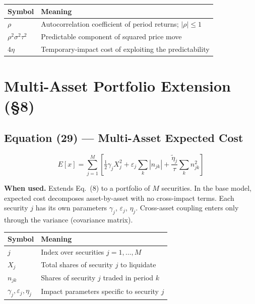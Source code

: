 \documentclass[11pt,a4paper]{article}
\begin{document}
\begin{center}
\begin{tabular}{@{}L{3.5cm}L{10cm}@{}}
\toprule
\textbf{Symbol} & \textbf{Meaning} \\
\midrule
$\rho$ & Autocorrelation coefficient of period returns; $|\rho|\leq1$ \\
$\rho^2\sigma^2\tau^2$ & Predictable component of squared price move \\
$4\eta$ & Temporary-impact cost of exploiting the predictability \\
\bottomrule
\end{tabular}
\end{center}

\section{Multi-Asset Portfolio Extension (\texorpdfstring{\S}{§}8)}

\subsection*{Equation (29) — Multi-Asset Expected Cost}

\begin{equation}
  E[x] = \sum_{j=1}^{M}\left[
    \tfrac{1}{2}\gamma_j X_j^2
    + \varepsilon_j\sum_{k}|n_{jk}|
    + \frac{\tilde{\eta}_j}{\tau}\sum_{k}n_{jk}^2
  \right]
\end{equation}

\textbf{When used.} Extends Eq.~(8) to a portfolio of $M$ securities.  In the base
model, expected cost decomposes asset-by-asset with no cross-impact terms.  Each security
$j$ has its own parameters $\gamma_j$, $\varepsilon_j$, $\eta_j$.  Cross-asset coupling
enters only through the variance (covariance matrix).

\begin{center}
\begin{tabular}{@{}L{3.5cm}L{10cm}@{}}
\toprule
\textbf{Symbol} & \textbf{Meaning} \\
\midrule
$j$ & Index over securities $j = 1,\ldots,M$ \\
$X_j$ & Total shares of security $j$ to liquidate \\
$n_{jk}$ & Shares of security $j$ traded in period $k$ \\
$\gamma_j,\varepsilon_j,\eta_j$ & Impact parameters specific to security $j$ \\
\bottomrule
\end{tabular}
\end{center}
\end{document}
